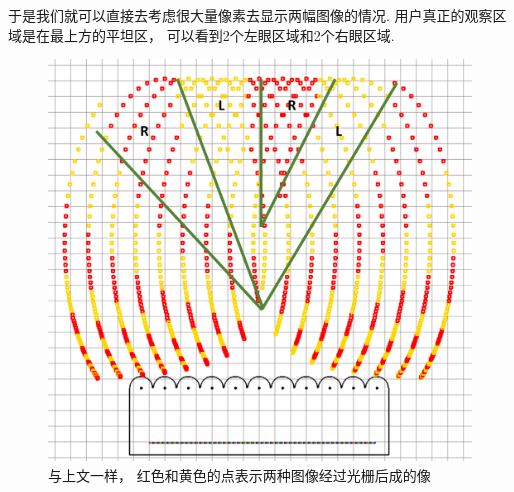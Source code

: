 \documentclass[12pt,a4paper]{article}
\begin{document}
于是我们就可以直接去考虑很大量像素去显示两幅图像的情况. 用户真正的观察区域是在最上方的平坦区， 可以看到2个左眼区域和2个右眼区域.
\begin{figure}[h!]
    \centering\includegraphics[width=0.8\linewidth]{double}
    \caption{与上文一样， 红色和黄色的点表示两种图像经过光栅后成的像}
\end{figure}
\end{document}
